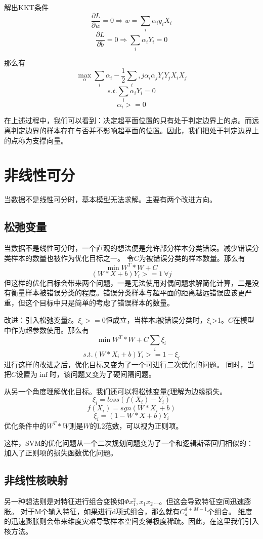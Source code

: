 \documentclass{article}
\begin{document}
解出KKT条件
$$\frac {\partial L} {\partial w}=0 \Rightarrow w= \sum\limits_i\alpha_iy_iX_i$$
$$\frac {\partial L} {\partial b}=0 \Rightarrow \sum\limits_i\alpha_iY_i=0$$

那么有
$$\max\limits_\alpha \sum_i\alpha_i-\frac 1 2 \sum_i,j \alpha_i\alpha_jY_iY_jX_iX_j$$
$$s.t. \sum_i\alpha_iY_i=0$$
$$\alpha_i >=0$$

在上述过程中，我们可以看到：决定超平面位置的只有处于判定边界上的点。而远离判定边界的样本存在与否并不影响超平面的位置。因此，我们把处于判定边界上的点称为支撑向量。

\section{非线性可分}

当数据不是线性可分时，基本模型无法求解。主要有两个改进方向。
\subsection{松弛变量}
当数据不是线性可分时，一个直观的想法便是允许部分样本分类错误。减少错误分类样本的数量也被作为优化目标之一。
令$C$为被错误分类的样本数量。那么有
$$\min W^T*W+C$$
$$(W*X+b)Y_i>=1\ \forall j$$
但这样的优化目标会带来两个问题，一是无法使用对偶问题求解简化计算，二是没有衡量样本被错误分类的程度。错误分类样本与超平面的距离越远错误应该更严重，但这个目标中只是简单的考虑了错误样本的数量。

改进：引入松弛变量$\xi$。$\xi_i>=0$恒成立，当样本i被错误分类时，$\xi_i$>1。$C$在模型中作为超参数使用。那么有
$$\min W^T*W+C\sum\limits_i\xi_i$$
$$s.t. (W*X_i+b)Y_i >= 1-\xi_i$$
进行这样的改进之后，优化目标又变为了一个可进行二次优化的问题。
同时，当把$C$设置为$\inf$时，该问题又变为了硬间隔问题。

从另一个角度理解优化目标。我们还可以将松弛变量$\xi$理解为边缘损失。
$$\xi_i = loss(f(X_i)-Y_i)$$
$$f(X_i) = sgn(W*X_i+b)$$
$$\xi_i = (1-W*X+b)Y_i$$
优化条件中的$W^T*W$则是$W$的L2范数，可以视为正则项。

这样，SVM的优化问题从一个二次规划问题变为了一个和逻辑斯蒂回归相似的：加入了正则项的损失函数优化问题。
\subsection{非线性核映射}
另一种想法则是对特征进行组合变换如$\Phi x_1^2,x_1x_2...$。但这会导致特征空间迅速膨胀。
对于M个输入特征，如果进行d项式组合，那么就有$C_d^{d+M-1}$个组合。
维度的迅速膨胀则会带来维度灾难导致样本空间变得极度稀疏。因此，在这里我们引入核方法。
\end{document}
